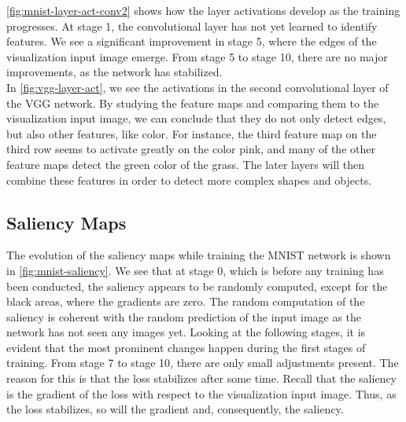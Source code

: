 \noindent \autoref{fig:mnist-layer-act-conv2} shows how the layer activations develop as the training progresses. At stage 1, the convolutional layer has not yet learned to identify features. We see a significant improvement in stage 5, where the edges of the visualization input image emerge. From stage 5 to stage 10, there are no major improvements, as the network has stabilized. \\

\noindent In \autoref{fig:vgg-layer-act}, we see the activations in the second convolutional layer of the VGG network. By studying the feature maps and comparing them to the visualization input image, we can conclude that they do not only detect edges, but also other features, like color. For instance, the third feature map on the third row seems to activate greatly on the color pink, and many of the other feature maps detect the green color of the grass. The later layers will then combine these features in order to detect more complex shapes and objects.


\subsection{Saliency Maps}

The evolution of the saliency maps while training the MNIST network is shown in \autoref{fig:mnist-saliency}. We see that at stage 0, which is before any training has been conducted, the saliency appears to be randomly computed, except for the black areas, where the gradients are zero. The random computation of the saliency is coherent with the random prediction of the input image as the network has not seen any images yet. Looking at the following stages, it is evident that the most prominent changes happen during the first stages of training. From stage 7 to stage 10, there are only small adjustments present. The reason for this is that the loss stabilizes after some time. Recall that the saliency is the gradient of the loss with respect to the visualization input image. Thus, as the loss stabilizes, so will the gradient and, consequently, the saliency. \\

